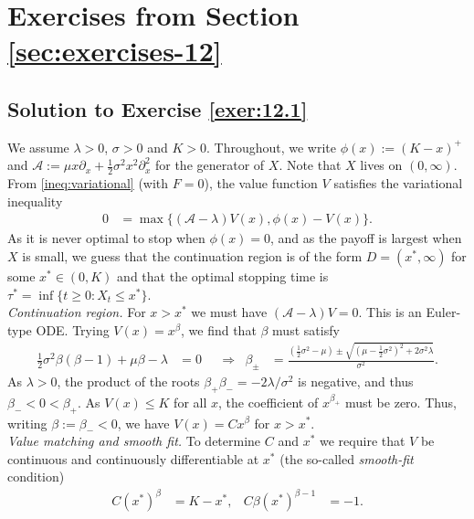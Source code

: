 \documentclass[12pt]{book}
\let\varphi\phi
\numberwithin{equation}{chapter}
\theoremstyle{plain}
\numberwithin{theorem}{section}
\theoremstyle{definition}
\numberwithin{exercise}{chapter}
\newcommand{\<}{\langle}
\renewcommand{\>}{\rangle}
\renewcommand{\(}{\left(}
\renewcommand{\)}{\right)}
\renewcommand{\[}{\left[}
\renewcommand{\]}{\right]}
\newcommand\Ac{\mathscr{A}}
\newcommand\sig{\sigma}
\newcommand\lam{\lambda}
\renewcommand\d{\partial}
\begin{document}

\section{Exercises from Section \ref{sec:exercises-12}}

\subsection*{Solution to Exercise \ref{exer:12.1}}
We assume $\lam > 0$, $\sig > 0$ and $K > 0$.  Throughout, we write $\varphi(x) := (K - x)^+$ and $\Ac := \mu x \d_x + \tfrac{1}{2} \sig^2 x^2 \d_x^2$ for the generator of $X$.  Note that $X$ lives on $(0,\infty)$.  From \eqref{ineq:variational} (with $F = 0$), the value function $V$ satisfies the variational inequality
\begin{align}
0
	&=	\max \{ (\Ac - \lam) V(x) , \varphi(x) - V(x) \} .
\end{align}
As it is never optimal to stop when $\varphi(x) = 0$, and as the payoff is largest when $X$ is small, we guess that the continuation region is of the form $D = (x^*,\infty)$ for some $x^* \in (0,K)$ and that the optimal stopping time is $\tau^* = \inf \{ t \geq 0 : X_t \leq x^* \}$.
\\[0.5em]
\textit{Continuation region.}  For $x > x^*$ we must have $(\Ac - \lam) V = 0$.  This is an Euler-type ODE.  Trying $V(x) = x^\beta$, we find that $\beta$ must satisfy
\begin{align}
\tfrac{1}{2} \sig^2 \beta (\beta - 1) + \mu \beta - \lam
	&=	0 &
	&\Rightarrow&
\beta_\pm
	&=	\frac{ ( \tfrac{1}{2} \sig^2 - \mu ) \pm \sqrt{ ( \mu - \tfrac{1}{2} \sig^2 )^2 + 2 \sig^2 \lam } }{\sig^2} .
\end{align}
As $\lam > 0$, the product of the roots $\beta_+ \beta_- = - 2 \lam / \sig^2$ is negative, and thus $\beta_- < 0 < \beta_+$.  As $V(x) \leq K$ for all $x$, the coefficient of $x^{\beta_+}$ must be zero.  Thus, writing $\beta := \beta_- < 0$, we have $V(x) = C x^\beta$ for $x > x^*$.
\\[0.5em]
\textit{Value matching and smooth fit.}  To determine $C$ and $x^*$ we require that $V$ be continuous and continuously differentiable at $x^*$ (the so-called \emph{smooth-fit} condition)
\begin{align}
C (x^*)^\beta
	&=	K - x^* , &
C \beta (x^*)^{\beta - 1}
	&=	- 1 .
\end{align}
\end{document}
